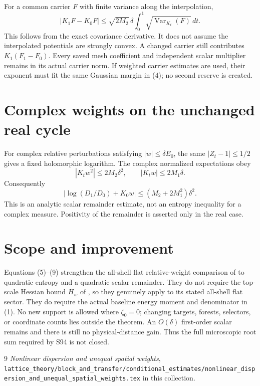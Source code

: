\documentclass{article}
\begin{document}
For a common carrier $F$ with finite variance along the interpolation,
\[
 |K_1F-K_0F|\leq\sqrt{2M_2}\,\delta
 \int_0^1\sqrt{\operatorname{Var}_{K_t}(F)}\,dt.
 \tag{8}
\]
This follows from the exact covariance derivative. It does not assume the interpolated potentials are strongly convex. A changed carrier still contributes $K_1(F_1-F_0)$. Every saved mesh coefficient and independent scalar multiplier remains in its actual carrier norm. If weighted carrier estimates are used, their exponent must fit the same Gaussian margin in (4); no second reserve is created.

\section{Complex weights on the unchanged real cycle}
For complex relative perturbations satisfying $|w|\leq\delta E_0$, the same $|Z_t-1|\leq1/2$ gives a fixed holomorphic logarithm. The complex normalized expectations obey
\[
 |K_tw^2|\leq2M_2\delta^2,\qquad
 |K_tw|\leq2M_1\delta.
\]
Consequently
\[
 \left|\log(D_1/D_0)+K_0w\right|
 \leq(M_2+2M_1^2)\delta^2.
 \tag{9}
\]
This is an analytic scalar remainder estimate, not an entropy inequality for a complex measure. Positivity of the remainder is asserted only in the real case.

\section{Scope and improvement}
Equations (5)--(9) strengthen the all-shell flat relative-weight comparison of \cite[Section 6]{ND} to quadratic entropy and a quadratic scalar remainder. They do not require the top-scale Hessian bound $H_w$ of \cite[Section 4]{ND}, so they genuinely apply to its stated all-shell flat sector. They do require the actual baseline energy moment and denominator in (1). No new support is allowed where $\zeta_0=0$; changing targets, forests, selectors, or coordinate counts lies outside the theorem. An $O(\delta)$ first-order scalar remains and there is still no physical-distance gain. Thus the full microscopic root sum required by S94 is not closed.
\begin{thebibliography}{9}
 \emph{Nonlinear dispersion and unequal spatial weights}, \texttt{lattice\_theory/block\_and\_transfer/conditional\_estimates/nonlinear\_dispersion\_and\_unequal\_spatial\_weights.tex} in this collection.
\end{thebibliography}
\end{document}
